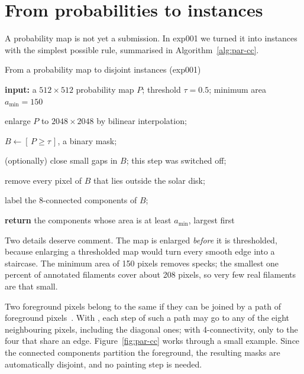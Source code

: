 \section{From probabilities to instances}\label{sec:paradigms-cc}
A probability map is not yet a submission. In exp001 we turned it into instances with the simplest
possible rule, summarised in Algorithm~\ref{alg:par-cc}.

\begin{algorithmblock}{From a probability map to disjoint instances (exp001)\label{alg:par-cc}}
\item \textbf{input:} a $512\times512$ probability map $P$; threshold $\tau=0.5$; minimum area $a_{\min}=150$
\item enlarge $P$ to $2048\times2048$ by bilinear interpolation;
\item $B\leftarrow[\,P\ge\tau\,]$, a binary mask;
\item (optionally) close small gaps in $B$; this step was switched off;
\item remove every pixel of $B$ that lies outside the solar disk;
\item label the 8-connected components of $B$;
\item \textbf{return} the components whose area is at least $a_{\min}$, largest first
\end{algorithmblock}

Two details deserve comment. The map is enlarged \emph{before} it is thresholded, because enlarging
a thresholded map would turn every smooth edge into a staircase. The minimum area of 150 pixels
removes specks; the smallest one percent of annotated filaments cover about 208 pixels, so very few
real filaments are that small.

Two foreground pixels belong to the same  if they can be joined by a
path of foreground pixels~\citep{rosenfeld1966}. With , each step of such a path may go to any of
the eight neighbouring pixels, including the diagonal ones; with 4-connectivity, only to the four
that share an edge. Figure~\ref{fig:par-cc} works through a small example. Since the connected
components partition the foreground, the resulting masks are automatically disjoint, and no
painting step is needed.

